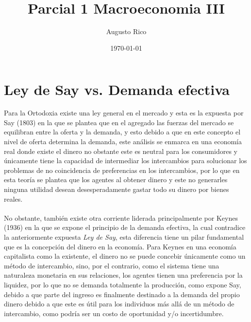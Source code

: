 \documentclass[letter,12pt]{article}
\title{\textbf{Parcial 1 Macroeconomia III}}
\author{Augusto Rico}
\date{\today}
\begin{document}
\maketitle
\section{Ley de Say vs. Demanda efectiva}
\begin{flushleft}
    Para la Ortodoxia existe una ley general en el mercado y esta es la expuesta por Say (1803) en la que se plantea que en el agregado las fuerzas del mercado se equilibran entre la oferta y la demanda, y esto debido a que en este concepto el nivel de oferta determina la demanda, este análisis se enmarca en una economía real donde existe el dinero no obstante este es neutral para los consumidores y únicamente tiene la capacidad de intermediar los intercambios para solucionar los problemas de no coincidencia de preferencias en los intercambios, por lo que en esta teoría se plantea que los agentes al obtener dinero y este no generarles ninguna utilidad desean desesperadamente gastar todo su dinero por bienes reales.\\
    ~\\
    No obstante, también existe otra corriente liderada principalmente por Keynes (1936) en la que se expone el principio de la demanda efectiva, la cual contradice la anteriormente expuesta \textit{Ley de Say}, esta diferencia tiene un pilar fundamental que es la concepción del dinero en la economía. Para Keynes en una economía capitalista como la existente, el dinero no se puede concebir únicamente como un método de intercambio, sino, por el contrario, como el sistema tiene una naturaleza monetaria en sus relaciones, los agentes tienen una preferencia por la liquidez, por lo que no se demanda totalmente la producción, como expone Say, debido a que parte del ingreso es finalmente destinado a la demanda del propio dinero debido a que este es útil para los individuos más allá de un método de intercambio, como podría ser un costo de oportunidad y/o incertidumbre.\\
    ~\\

\end{flushleft}
\end{document}
